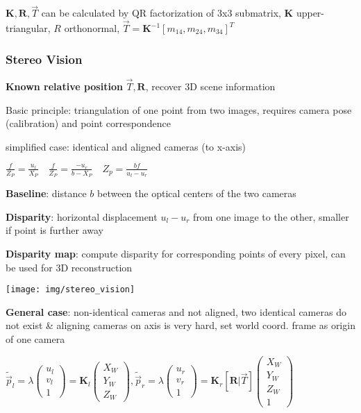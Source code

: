 \documentclass[fontsize=6pt]{scrartcl}
\newcommand{\mat}[1]{\mathbf{#1}}
\begin{document}
\begin{multicols*}{4}
$\mat K, \mat R, \vec T$ can be calculated by QR factorization of 3x3 submatrix, $\mat K $ upper-triangular, $R$ orthonormal, $\vec T = \mat K^{-1}[m_{14}, m_{24}, m_{34}]^T$


\subsubsection*{Stereo Vision}
\textbf{Known relative position} $\vec T, \mat R$, recover 3D scene information

Basic principle: triangulation of one point from two images, requires camera pose (calibration) and point correspondence

\begin{minipage}{0.6\linewidth}
	
	simplified case: identical and aligned cameras (to x-axis)
	
	$ \frac{f}{Z_P} = \frac{u_l}{X_P} \quad \frac{f}{Z_P} = \frac{-u_r}{b-X_P} \quad Z_p = \frac{bf}{u_l - u_r}$
	
	\textbf{Baseline}: distance $b$ between the optical centers of the two cameras
	
	\textbf{Disparity}: horizontal displacement $u_l - u_r$ from one image to the other, smaller if point is further away
	
	\textbf{Disparity map}: compute disparity for corresponding points of every pixel, can be used for 3D reconstruction
\end{minipage}
\begin{minipage}{0.4\linewidth}
	\texttt{[image: img/stereo\_vision]}
\end{minipage}

\textbf{General case}: non-identical cameras and not aligned, two identical cameras do not exist \& aligning cameras on axis is very hard, set world coord. frame as origin of one camera

$
\tilde{\vec p}_l = \lambda
\left(
\begin{smallmatrix}
u_l\\
v_l\\
1
\end{smallmatrix}
\right)
= \mat K_l 
\left(
\begin{smallmatrix}
X_W\\
Y_W\\
Z_W
\end{smallmatrix}
\right)
,
\tilde{\vec p}_r = \lambda
\left(
\begin{smallmatrix}
u_r\\
v_r\\
1
\end{smallmatrix}
\right)
= \mat K_r 
\left[\mat R | \vec T\right]
\left(
\begin{smallmatrix}
X_W\\
Y_W\\
Z_W\\
1
\end{smallmatrix}
\right)
$


\end{multicols*}
\end{document}
